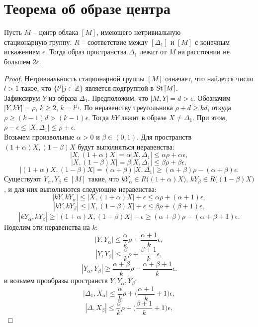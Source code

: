 
\section{Теорема об образе центра}
\begin{theorem}
Пусть $M$ -- центр облака $[M]$, имеющего нетривиальную
\\стационарную группу. $R$ -- соответствие между $[\Delta_{1}]$ и $[M]$ с конечным
искажением $\epsilon$. Тогда образ пространства $\Delta_{1}$ лежит от $M$ на
расстоянии не большем $2\epsilon$.
\end{theorem}
\begin{proof}
Нетривиальность стационарной группы $[M]$ означает, что найдется
число $l > 1$ такое, что $\{l^{j}|j\in \mathbb{Z}\}$ является подгруппой в
$\operatorname{St}{[M]}$.\\
Зафиксирум $Y$ из образа $\Delta_{1}$.
Предположим, что $|M, Y| = d > \epsilon$.  Обозначим
$|Y, kY| = \rho$, $k \ge 2$, $k = l^{j_{1}}$. По неравенству треугольника $\rho + d \ge kd$,
откуда $\rho \ge (k-1)d > (k-1)\epsilon$. Тогда $kY$ лежит в образе
$X \ne \Delta_1$. При этом,
$\rho - \epsilon \le |X, \Delta_1| \le \rho + \epsilon$. \\
Возьмем произвольные $\alpha > 0$ и $\beta \in (0,1)$. Для пространств $(1+\alpha)X, (1-\beta)X$ будут выполняться неравенства:
	$$|X, (1+\alpha)X| = \alpha |X, \Delta_1| \le \alpha\rho + \alpha\epsilon,$$
	$$|X, (1-\beta)X| = \beta|X, \Delta_1| \le \beta\rho + \beta\epsilon,$$
	$$|(1+\alpha) X, (1-\beta)X| = (\alpha + \beta)|X, \Delta_1| \ge (\alpha+\beta)\rho - (\alpha+\beta)\epsilon.$$
 Существуют
$Y_\alpha, Y_\beta \in [M]$ такие, что
$kY_\alpha \in R\big((1+\alpha)X\big)$, $kY_\beta \in R\big((1-\beta)X\big)$, и
для них выполняются следующие неравенства:
	$$|kY, kY_\alpha| \le |X, (1+\alpha)X| + \epsilon \le \alpha\rho + (\alpha+1)\epsilon,$$
	$$|kY, kY_\beta| \le |X, (1-\beta)X| + \epsilon \le \beta\rho + (\beta+1)\epsilon,$$
	$$|kY_\alpha, kY_\beta| \ge |(1+\alpha)X, (1-\beta)X| - \epsilon \ge  (\alpha+\beta)\rho - (\alpha+\beta+1)\epsilon.$$
	Поделим эти неравенства на $k$:
	$$|Y, Y_{\alpha}| \le \frac{\alpha}{k}\rho + \frac{\alpha+1}{k}\epsilon,$$
	$$|Y, Y_{\beta}| \le \frac{\beta}{k}\rho + \frac{\beta+1}{k}\epsilon,$$
	$$|Y_\alpha, Y_{\beta}| \ge \frac{\alpha+\beta}{k}\rho - \frac{\alpha+\beta+1}{k}\epsilon.$$
	и возьмем прообразы пространств $Y, Y_{\alpha}, Y_{\beta}$:
	$$|\Delta_1, X_{\alpha}| \le \frac{\alpha}{k}\rho + \big(\frac{\alpha+1}{k} + 1\big)\epsilon,$$
	$$|\Delta, X_{\beta}| \le \frac{\beta}{k}\rho + \big(\frac{\beta+1}{k}+1\big)\epsilon,$$

\end{proof}
